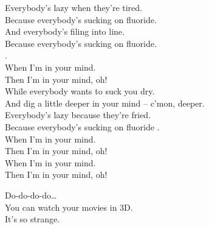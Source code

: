 
\label{album:im-in-your-mind-fuzz}





Everybody's lazy when they're tired. \\
Because everybody's sucking on fluoride. \\
And everybody's filing into line. \\
Because everybody's sucking on fluoride. \\. \\

When I'm in your mind. \\
Then I'm in your mind, oh! \\

While everybody wants to suck you dry. \\
And dig a little deeper in your mind -- c'mon, deeper. \\
Everybody's lazy because they're fried. \\
Because everybody's sucking on fluoride . \\

When I'm in your mind. \\
Then I'm in your mind, oh! \\
When I'm in your mind. \\
Then I'm in your mind, oh! \\









Do-do-do-do… \\

You can watch your movies in 3D. \\
It's so strange. \\

